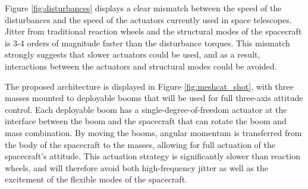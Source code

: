 Figure \ref{fig:disturbances} displays a clear mismatch between the speed of the disturbances and the speed of the actuators currently used in space telescopes. Jitter from traditional reaction wheels and the structural modes of the spacecraft is 3-4 orders of magnitude faster than the disturbance torques. This mismatch strongly suggests that slower actuators could be used, and as a result, interactions between the actuators and structural modes could be avoided. 

The proposed architecture is displayed in Figure \ref{fig:meshcat_shot}, with three masses mounted to deployable booms that will be used for full three-axis attitude control. Each deployable boom has a single-degree-of-freedom actuator at the interface between the boom and the spacecraft that can rotate the boom and mass combination. By moving the booms, angular momentum is transferred from the body of the spacecraft to the masses, allowing for full actuation of the spacecraft's attitude.  This actuation strategy is significantly slower than reaction wheels, and will therefore avoid both high-frequency jitter as well as the excitement of the flexible modes of the spacecraft. 

